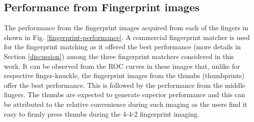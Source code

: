 \subsection{Performance from Fingerprint images\label{fp-performance}}

The performance from the fingerprint images acquired from each of the fingers in shown in Fig. \ref{fingerprint-performance}. A commercial fingerprint matcher is used for the fingerprint matching as it offered the best performance (more details in Section \ref{discussion}) among the three fingerprint matchers considered in this work. It can be observed from the ROC curves in these images that, unlike for respective finger-knuckle, the fingerprint images from the thumbs (thumbprints) offer the best performance. This is followed by the performance from the middle fingers. The thumbs are expected to generate superior performance and this can be attributed to the relative convenience during such imaging as the users find it easy to firmly press thumbs during the 4-4-2 fingerprint imaging. 

